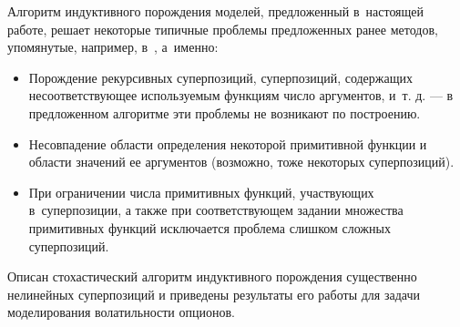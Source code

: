 \documentclass[12pt,a4paper]{amsart}
\begin{document}
Алгоритм индуктивного порождения моделей, предложенный в~настоящей работе,
решает некоторые типичные проблемы предложенных ранее методов, упомянутые,
например, в~\cite{Zelinka2008}, а~именно:
\begin{itemize}
  \item Порождение рекурсивных суперпозиций, суперпозиций, содержащих
	несоответствующее используемым функциям число аргументов, и~т. д. --- в
	предложенном алгоритме эти проблемы не возникают по построению.
  \item Несовпадение области определения некоторой примитивной функции и области
	значений ее аргументов (возможно, тоже некоторых суперпозиций).
  \item При ограничении числа примитивных функций, участвующих в~суперпозиции,
	а также при соответствующем задании множества примитивных функций
	исключается проблема слишком сложных суперпозиций.
\end{itemize}

Описан стохастический алгоритм индуктивного порождения существенно нелинейных
суперпозиций и приведены результаты его работы для задачи моделирования
волатильности опционов.


\extrasrussian

\end{document}
